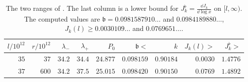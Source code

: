 \documentclass[11pt,colorlinks]{charlie}
\begin{document}
\begin{table}[ht]
\centering\footnotesize\setlength{\tabcolsep}{4pt}
\begin{tabular}{@{}rrrrrrrrr@{}}
\toprule
$l/10^{12}$ & $r/10^{12}$ & $\lambda_-$ & $\lambda_+$ & $P_0$ & $\mathfrak b<$ & $k$ & $J_k(l)>$ & $J_k^\flat>$\\
\midrule
$35$ & $37$ & $34.2$ & $34.4$ & $24.877$ & $0.098159$ & $0.90184$ & $0.0030$ & $1.4776$\\
$37$ & $600$ & $34.2$ & $37.5$ & $25.015$ & $0.098420$ & $0.90150$ & $0.0769$ & $1.4892$\\
\bottomrule
\end{tabular}
\caption{The two ranges of . The last column is a lower bound for $J_k^\flat=\frac{\dd J_k}{\dd\log x}$ on $[l,\infty)$. The computed values are $\mathfrak b=0.0981587910\ldots$ and $0.0984189880\ldots$, $J_k(l)\ge0.0030109\ldots$ and $0.0769651\ldots$.}\label{tab:twelve}
\end{table}
\end{document}
